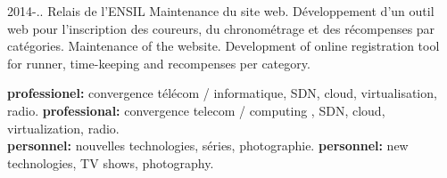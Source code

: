 \documentclass[print]{cv-style}
\begin{document}

\begin{entrylist}
\entry
{2014-..}
{}
{Relais de l'ENSIL}
{\translate
   {Maintenance du site web. Développement d'un outil web pour l'inscription des coureurs, du chronométrage et des récompenses par catégories.}
   {Maintenance of the website. Development of online registration tool for runner, time-keeping and recompenses per category.}
}
\end{entrylist}

  \vspace{-0.2cm}

\translate
{\textbf{professionel:} convergence télécom / informatique, SDN, cloud, virtualisation, radio.}
{\textbf{professional:} convergence telecom / computing  , SDN, cloud, virtualization, radio.}
\\
\translate
{\textbf{personnel:} nouvelles technologies, séries, photographie.}
{\textbf{personnel:} new technologies, TV shows, photography.}

\end{document}
